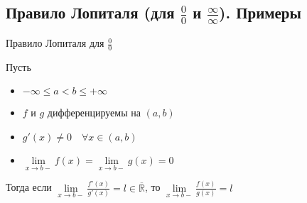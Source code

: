\subsection{Правило Лопиталя (для $\frac{0}{0}$ и $\frac{\infty}{\infty}$). Примеры \href{https://youtu.be/au9-34CerJM?t=278}{\Walley}}

\begin{theorem-non} 
    Правило Лопиталя для $\frac{0}{0}$

    Пусть 
    \begin{itemize}
        \item $-\infty \leq a < b \leq +\infty$
        \item $f$ и $g$ дифференцируемы на $(a, b)$
        \item $g'(x) \neq 0 \quad \forall x \in (a, b)$
        \item $\lim\limits_{x \rightarrow b-} f(x) = \lim\limits_{x \rightarrow b-} g(x) = 0$
    \end{itemize}
    Тогда если $\lim\limits_{x \rightarrow b-}\frac{f'(x)}{g'(x)} = l \in \overline{\mathbb{R}}$, 
    то $\lim\limits_{x \rightarrow b-}\frac{f(x)}{g(x)} = l$
\end{theorem-non}
